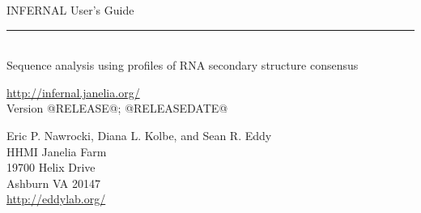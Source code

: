 \begin{titlepage}
{\Large

\vspace*{\fill}

\noindent
{\Huge \textsf{INFERNAL User's Guide}} \\ 
\rule[2pt]{\textwidth}{1pt} \\
\hspace*{\fill} {\large \textsf{Sequence analysis using profiles of RNA secondary structure consensus}\\}

\vspace*{\fill}

\begin{center}
\url{http://infernal.janelia.org/}\\
Version @RELEASE@; @RELEASEDATE@ \\ 

\vspace*{\fill}

Eric P. Nawrocki, Diana L. Kolbe, and Sean R. Eddy\\
HHMI Janelia Farm\\
19700 Helix Drive\\
Ashburn VA 20147\\
\url{http://eddylab.org/}
\end{center}

\vspace*{\fill}

}
\end{titlepage}
